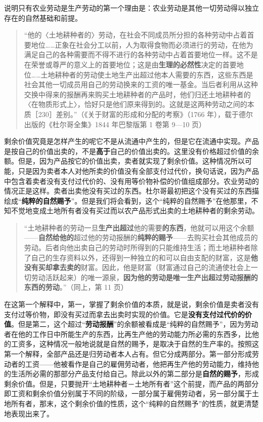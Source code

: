 说明只有农业劳动是生产劳动的第一个理由是：农业劳动是其他一切劳动得以独立存在的自然基础和前提。

\begin{quote}“他的〈土地耕种者的〉劳动，在社会不同成员所分担的各种劳动中占着首要地位……正象在社会分工以前，人为取得食物而必须进行的劳动，在他为满足自己的各种需要而不得不进行的各种劳动中占着首要地位一样。这不是在荣誉或尊严的意义上的首要地位；这是由\textbf{生理的必然性}决定的首要地位……土地耕种者的劳动使土地生产出超过他本人需要的东西，这些东西是社会其他一切成员用自己的劳动换来的工资的唯一基金。当后者利用从这种交换中得来的报酬再来购买土地耕种者的产品时，他们归还土地耕种者的〈在物质形式上〉，恰好只是他们原来得到的。这就是这两种劳动之间的本质［230］差别。”（《关于财富的形成和分配的考察》（1766 年），载于德尔出版的《杜尔哥全集》1844 年巴黎版第 1 卷第 9—10 页）\end{quote}

剩余价值究竟是怎样产生的呢它不是从流通中产生的，但是它在流通中实现。产品是按自己的价值出卖的，不是\textbf{高于}自己的价值出卖的。这里没有价格超过价值的余额。但是，因为产品按它的价值出卖，卖者就实现了剩余价值。这种情况所以可能，只是因为卖者本人对他所卖的价值没有全部支付过代价，换句话说，因为产品中包含着卖者没有支付过代价的、没有用等价物补偿的价值组成部分。农业劳动的情况正是这样。卖者出卖他没有买过的东西。杜尔哥最初把这个没有买过的东西描绘成“\textbf{纯粹的自然赐予}”。但是我们将会看到，这个“纯粹的自然赐予”在他那里，不知不觉地变成土地所有者没有买过而以农产品形式出卖的土地耕种者的剩余劳动。

\begin{quote}“土地耕种者的劳动一旦\textbf{生产出超过}他的需要\textbf{的东西}，他就可以用这个余额——\textbf{自然给他的}超过他的劳动报酬的\textbf{纯粹的赐予}——去购买社会其他成员的劳动。后者向他出卖自己的劳动时所得到的只能维持生活；而土地耕种者除了自己的生存资料以外，还得到一种独立的和可以自由支配的财富，这是\textbf{他没有买却拿去卖的}财富。因此，他是财富（财富通过自己的流通使社会上一切劳动活跃起来）的唯一源泉，\textbf{因为他的劳动是唯一生产出超过劳动报酬的东西的劳动}。”（同上，第 11 页）\end{quote}

在这第一个解释中，第一，掌握了剩余价值的本质，就是说，剩余价值是卖者没有支付过等价物，即没有买过而拿去出卖时实现的价值。它是\textbf{没有支付过代价的价值}。但是第二，这个超过“\textbf{劳动报酬}”的余额被看成是“纯粹的自然赐予”，因为劳动者在他的工作日中所能生产的东西，比再生产他的劳动能力所必需的东西多，比他的工资多，这种情况一般地说就是自然的赐予，是取决于自然的生产率的。按照这第一个解释，全部产品还是归劳动者本人占有。但它分成两部分。第一部分形成劳动者的工资——他被看作是自己的雇佣劳动者，他把再生产他的劳动能力，维持他的生活所必需的那部分产品支付给自己。除此以外的第二部分是\textbf{自然的赐予}，形成剩余价值。但是，只要抛开“土地耕种者－土地所有者”这个前提，而产品的两部分即工资和剩余价值分别属于不同的阶级，一部分属于雇佣劳动者，另一部分属于土地所有者，那末，这个剩余价值的性质，这个“纯粹的自然赐予”的性质，就更清楚地表现出来了。


